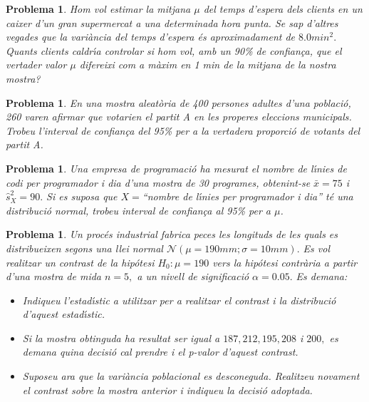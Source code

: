 \documentclass[11pt]{article}
\newcounter{prbcont}
\newtheorem{problema}[prbcont]{Problema}
\begin{document}
\begin{problema}
Hom vol estimar la mitjana $\mu$ del temps d'espera dels clients en un caixer d'un gran
supermercat a una determinada hora punta. Se sap d'altres vegades que la vari\`ancia
del temps d'espera \'es aproximadament de $8.0 min^2.$ Quants clients caldr\'{\i}a controlar
si hom vol, amb un 90\% de confian\c{c}a, que el vertader valor $\mu$ difereixi com a m\`axim
en 1 min de la mitjana de la nostra mostra? %
\end{problema}

\begin{problema}
En una mostra aleat\`oria de 400 persones adultes d'una poblaci\'o, 260 varen afirmar que
votarien el partit A en les properes eleccions municipals. Trobeu l'interval de confian\c{c}a
del 95\% per a la vertadera proporci\'o de votants del partit A. %
\end{problema}


\begin{problema}
Una empresa de programaci\'o ha mesurat el nombre de l\'{\i}nies de codi per programador
i dia d'una mostra de 30 programes, obtenint-se $\bar{x} = 75$ i $\hat{s}_X^2 = 90.$ Si es suposa
que $X=$``nombre de l\'{\i}nies per programador i dia'' t\'e una distribuci\'o normal, trobeu
interval de confian\c{c}a al 95\% per a $\mu$.
\end{problema}





\begin{problema}
Un proc\'es industrial fabrica peces les longituds de les quals es distribueixen segons una
llei normal $\mathcal{N}(\mu = 190 mm; \sigma = 10 mm).$ Es vol realitzar un contrast de la hip\'otesi $H_0 : \mu = 190$ vers la hip\'otesi contr\`aria a partir d'una mostra de mida $n = 5,$ a un nivell de significaci\'o $\alpha = 0.05.$ Es demana:
\begin{itemize}
\item [(a)] Indiqueu l'estad\'{\i}stic a utilitzar per a realitzar el contrast i la distribuci\'o d'aquest estad\'{\i}stic.
\item [(b)] Si la mostra obtinguda ha resultat ser igual a $187, 212, 195, 208$ i $200,$ es demana
quina decisi\'o cal prendre i el p-valor d'aquest contrast. %
\item [(c)] Suposeu ara que la vari\`ancia poblacional es desconeguda. Realitzeu novament
el contrast sobre la mostra anterior i indiqueu la decisi\'o adoptada. %
\end{itemize}
\end{problema}
\end{document}
